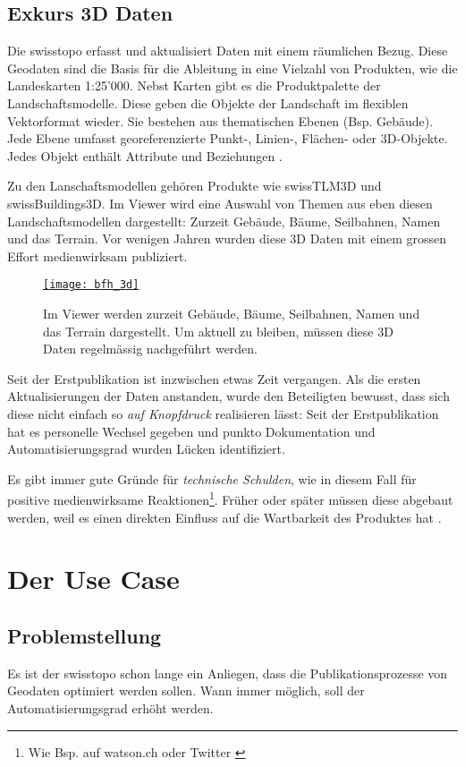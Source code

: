 \newpage

\subsection{Exkurs 3D Daten}
Die swisstopo erfasst und aktualisiert Daten mit einem räumlichen Bezug. Diese Geodaten sind die Basis für die Ableitung in eine Vielzahl von Produkten, wie die Landeskarten 1:25'000. Nebst Karten gibt es die Produktpalette der Landschaftsmodelle. Diese geben die Objekte der Landschaft im flexiblen Vektorformat wieder. Sie bestehen aus thematischen Ebenen (Bsp. Gebäude). Jede Ebene umfasst georeferenzierte Punkt-, Linien-, Flächen- oder 3D-Objekte. Jedes Objekt enthält Attribute und Beziehungen \cite{toposhop2010}.

Zu den Lanschaftsmodellen gehören Produkte wie swissTLM3D und swissBuildings3D. Im Viewer wird eine Auswahl von Themen aus eben diesen Landschaftsmodellen dargestellt: Zurzeit Gebäude, Bäume, Seilbahnen, Namen und das Terrain. Vor wenigen Jahren wurden diese 3D Daten mit einem grossen Effort medienwirksam publiziert.

\begin{figure}[H]
	\centering
	\href{https://s.geo.admin.ch/8a8ce63073}{
	\texttt{[image: bfh\_3d]}}
	\caption{Im Viewer werden zurzeit Gebäude, Bäume, Seilbahnen, Namen und das Terrain dargestellt. Um aktuell zu bleiben, müssen diese 3D Daten regelmässig nachgeführt werden.}
	\label{fig:bfh_3d}
\end{figure}

Seit der Erstpublikation ist inzwischen etwas Zeit vergangen. Als die ersten Aktualisierungen der Daten anstanden, wurde den Beteiligten bewusst, dass sich diese nicht einfach so \emph{auf Knopfdruck} realisieren lässt: Seit der Erstpublikation hat es personelle Wechsel gegeben und punkto Dokumentation und Automatisierungsgrad wurden Lücken identifiziert.

Es gibt immer gute Gründe für \emph{technische Schulden}, wie in diesem Fall für positive medienwirksame Reaktionen\footnote{Wie Bsp. auf watson.ch oder Twitter \cite{watson2018}}. Früher oder später müssen diese abgebaut werden, weil es einen direkten Einfluss auf die Wartbarkeit des Produktes hat \cite{technischeschulden2010}.

\section{Der Use Case}
\subsection{Problemstellung}
Es ist der swisstopo schon lange ein Anliegen, dass die Publikationsprozesse von Geodaten optimiert werden
sollen. Wann immer möglich, soll der Automatisierungsgrad erhöht werden.

